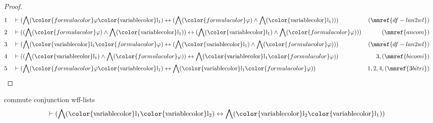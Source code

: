 \begin{proof}
\begin{align}
  1 && & \vdash ( \bigwedge( {\color{formulacolor}\varphi}
      {\rm\color{variablecolor}l_1} ) \leftrightarrow (
      \bigwedge( {\color{formulacolor}\varphi} ) \wedge
      \bigwedge( {\rm\color{variablecolor}l_1} ) )
      )&(\mmref{df-lan2wl})\notag
  \\ 2 && & \vdash ( ( \bigwedge( {\color{formulacolor}\varphi} ) \wedge
      \bigwedge( {\rm\color{variablecolor}l_1} ) )
      \leftrightarrow ( \bigwedge(
      {\rm\color{variablecolor}l_1} ) \wedge \bigwedge(
      {\color{formulacolor}\varphi} ) )
      )&(\mmref{ancom})\notag
  \\ 3 && & \vdash ( \bigwedge( {\rm\color{variablecolor}l_1}
      {\color{formulacolor}\varphi} ) \leftrightarrow (
      \bigwedge( {\rm\color{variablecolor}l_1} ) \wedge
      \bigwedge( {\color{formulacolor}\varphi} ) )
      )&(\mmref{df-lan2wl})\notag
  \\ 4 && & \vdash ( ( \bigwedge( {\rm\color{variablecolor}l_1} ) \wedge
      \bigwedge( {\color{formulacolor}\varphi} ) )
      \leftrightarrow \bigwedge(
      {\rm\color{variablecolor}l_1}
      {\color{formulacolor}\varphi} )
      )&3,(\mmref{bicomi})\notag
  \\ 5 && & \vdash ( \bigwedge( {\color{formulacolor}\varphi}
      {\rm\color{variablecolor}l_1} ) \leftrightarrow
      \bigwedge( {\rm\color{variablecolor}l_1}
      {\color{formulacolor}\varphi} )
      )&1,2,4,(\mmref{3bitri})\notag
\end{align}
\end{proof}

\begin{lemma} commute conjunction wff-lists
\begin{align}
\vdash ( \bigwedge( {\rm\color{variablecolor}l_1} {\rm\color{variablecolor}l_2}
    ) \leftrightarrow \bigwedge( {\rm\color{variablecolor}l_2}
    {\rm\color{variablecolor}l_1} ) )\label{bl.ancomwlwl}
\end{align}
\end{lemma}


